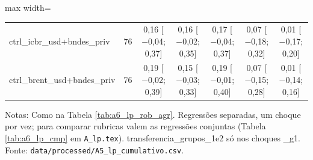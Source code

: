 \begin{table}[htbp]
\begin{adjustbox}{max width=\linewidth}
\begin{tabular}{lcccccc}
ctrl\_icbr\_usd+bndes\_priv & 76 & 0{,}16 [$-$0{,}04; 0{,}37] & 0{,}16 [$-$0{,}02; 0{,}35] & 0{,}17 [$-$0{,}04; 0{,}37] & 0{,}07 [$-$0{,}18; 0{,}32] & 0{,}01 [$-$0{,}17; 0{,}20] \\
ctrl\_brent\_usd+bndes\_priv & 76 & 0{,}19 [$-$0{,}02; 0{,}39] & 0{,}15 [$-$0{,}03; 0{,}33] & 0{,}19 [$-$0{,}01; 0{,}40] & 0{,}07 [$-$0{,}15; 0{,}28] & 0{,}01 [$-$0{,}14; 0{,}16] \\
\bottomrule
\end{tabular}
\end{adjustbox}
\begin{minipage}{0.97\linewidth}\footnotesize
\medskip Notas: Como na Tabela \ref{tab:a6_lp_rob_agr}. Regress\~oes separadas, um choque por vez; para comparar rubricas valem as regress\~oes conjuntas (Tabela \ref{tab:a6_lp_cmp} em \texttt{A\_lp.tex}). transferencia\_grupos\_1e2 s\'o nos choques \_g1. Fonte: \texttt{data/processed/A5\_lp\_cumulativo.csv}.
\end{minipage}
\end{table}

